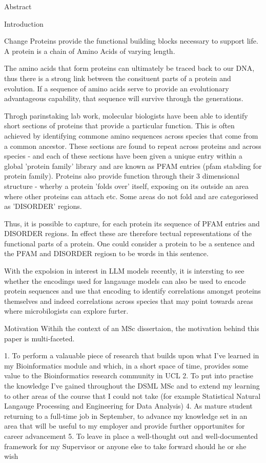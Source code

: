\documentclass{article}
\author{Patrick Lowry}
\date{Septemner 2024}
\begin{document}
Abstract

Introduction

Change Proteins provide the functional building blocks necessary to support life. A protein is a chain of Amino Acids of varying length. 

The amino acids that form proteins can ultimately be traced back to our DNA, thus there is a strong link between the consituent parts of a protein and evolution. If a sequence of amino acids serve to provide an evolutionary advantageous capability, that sequence will survive through the generations.

Throgh parinstaking lab work, molecular biologists have been able to identify short sections of proteins that provide a particular function. This is often achieved by identifying commone amino sequences across species that come from a common ancestor. These sections are found to repeat across proteins and across species - and each of these sections have been given a unique entry within a global 'protein family' library and are known as PFAM entries (pfam stabding for protein family). Proteins also provide function through their 3 dimensional structure - wherby a protein 'folds over' itself, exposing on its outside an area where other proteins can attach etc. Some areas do not fold and are categoriesed as 'DISORDER' regions.

Thus, it is possible to capture, for each protein its sequence of PFAM entries and DISORDER regions. In effect these are therefore tectual representations of the functional parts of a protein. One could consider a protein to be a sentence and the PFAM and DISORDER regiosn to be words in this sentence.

With the expolsion in interest in LLM models recently, it is intersting to see whether the encodings used for langauage models can also be used to encode protein sequences and use that encoding to identify correlations amongst proteins themselves and indeed correlations across species that may point towards areas where microbilogists can explore furter.

Motivation
Withih the context of an MSc dissertaion, the motivation behind this paper is multi-faceted.

1. To perform a valauable piece of research that builds upon what I've learned in my Bioinformatics module and which, in a short space of time,  provides some value to the Bioinformatics research community in UCL
2. To put into practise the knowledge I've gained throughout the DSML MSc and to extend my learning to other areas of the course that I could not take (for example Statistical Natural Langauge Processing and Engineering for Data Analysis)
4. As mature student returning to a full-time job in September, to advance my knowledge set in an area that will be useful to my employer and provide further opportunites for career advancement
5. To leave in place a well-thought out and well-documented framework for my Supervisor or anyone else to take forward should he or she wish
\end{document}

